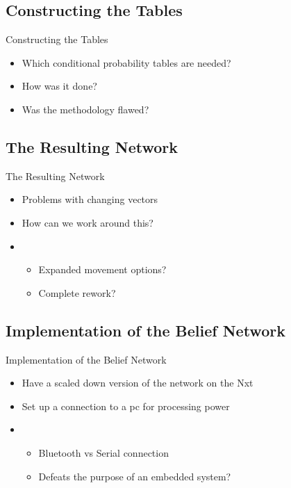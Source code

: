 \subsection{Constructing the Tables}
\begin{frame}{Constructing the Tables}
\begin{itemize}
\item Which conditional probability tables are needed?
\item How was it done? 
\item Was the methodology flawed?
\end{itemize}
\end{frame}


\subsection{The Resulting Network}
\begin{frame}{The Resulting Network}
\begin{itemize}
\item Problems with changing vectors
\item How can we work around this?
\item \begin{itemize}
  \item Expanded movement options?
  \item Complete rework?
  \end{itemize}
\end{itemize}
\end{frame}


\subsection{Implementation of the Belief Network}
\begin{frame}{Implementation of the Belief Network}
\begin{itemize}
\item Have a scaled down version of the network on the Nxt
\item Set up a connection to a pc for processing power
\item \begin{itemize}
   \item Bluetooth vs Serial connection
   \item Defeats the purpose of an embedded system?
   \end{itemize}
\end{itemize}
\end{frame}
